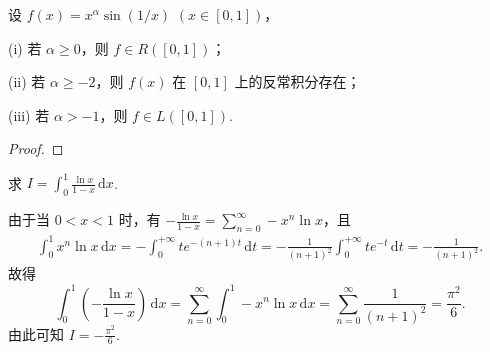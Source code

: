 \documentclass[../../main.tex]{subfiles}
\begin{document}
\begin{example}
设 \( f(x) = x^{\alpha} \sin(1/x) \) \( (x \in [0, 1]) \)，

(i) 若 \( \alpha \geqslant  0 \)，则 \( f \in R([0, 1]) \)；

(ii) 若 \( \alpha \geqslant  -2 \)，则 \( f(x) \) 在 \( [0, 1] \) 上的反常积分存在；

(iii) 若 \( \alpha > -1 \)，则 \( f \in L([0, 1]) \).
\end{example}
\begin{proof}

\end{proof}

\begin{example}
求 \( I = \int_0^1 \frac{\ln x}{1 - x} \, \mathrm{d}x \).
\end{example}
\begin{solution}
由于当 \( 0 < x < 1 \) 时，有 \( -\frac{\ln x}{1 - x} = \sum_{n = 0}^{\infty} -x^n \ln x \)，且
\begin{align*}
\int_0^1 x^n \ln x \, \mathrm{d}x = -\int_0^{+\infty} t e^{-(n + 1)t} \, \mathrm{d}t = -\frac{1}{(n + 1)^2} \int_0^{+\infty} t e^{-t} \, \mathrm{d}t = -\frac{1}{(n + 1)^2}.
\end{align*}
故得
\[
\int_0^1 \left( -\frac{\ln x}{1 - x} \right) \, \mathrm{d}x = \sum_{n = 0}^{\infty} \int_0^1 -x^n \ln x \, \mathrm{d}x = \sum_{n = 0}^{\infty} \frac{1}{(n + 1)^2} = \frac{\pi^2}{6}.
\]
由此可知 \( I = -\frac{\pi^2}{6} \).
\end{solution}
\end{document}
